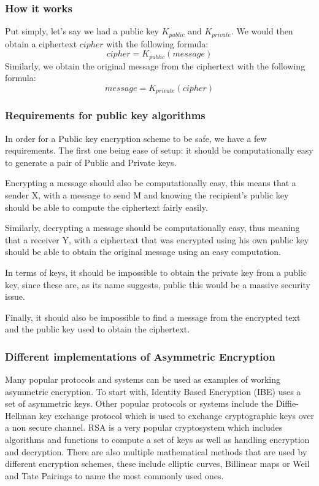 \documentclass[conference]{IEEEtran}
\begin{document}
\subsubsection{How it works}
Put simply, let's say we had a public key $K_{public}$ and $K_{private}$.
We would then obtain a ciphertext $cipher$ with the following formula: 
\begin{equation*}
    cipher = K_{public}(message)
\end{equation*}
Similarly, we obtain the original message from the ciphertext with the following formula:
\begin{equation*}
    message = K_{private}(cipher)
\end{equation*}


\subsubsection{Requirements for public key algorithms}
In order for a Public key encryption scheme to be safe, we have a few requirements.
The first one being ease of setup: it should be computationally easy to generate
a pair of Public and Private keys.

Encrypting a message should also be computationally easy, this means that a 
sender X, with a message to send M and knowing the recipient's public key 
should be able to compute the ciphertext fairly easily.

Similarly, decrypting a message should be computationally easy, thus meaning that
a receiver Y, with a ciphertext that was encrypted using his own public key 
should be able to obtain the original message using an easy computation.

In terms of keys, it should be impossible to obtain the private key from a 
public key, since these are, as its name suggests, public this would be a 
massive security issue.

Finally, it should also be impossible to find a message from the encrypted text and 
the public key used to obtain the ciphertext.


\subsubsection{Different implementations of Asymmetric Encryption}
Many popular protocols and systems can be used as examples of working 
asymmetric encryption. To start with, Identity Based Encryption (IBE)
uses a set of asymmetric keys. Other popular protocols or systems include
the Diffie-Hellman key exchange protocol which is used to exchange cryptographic 
keys over a non secure channel. RSA is a very popular cryptosystem which includes
algorithms and functions to compute a set of keys as well as handling encryption and decryption.
There are also multiple mathematical methods that are used by different encryption schemes,
these include  elliptic curves, Billinear maps or Weil and Tate Pairings to name
the most commonly used ones.
\end{document}
